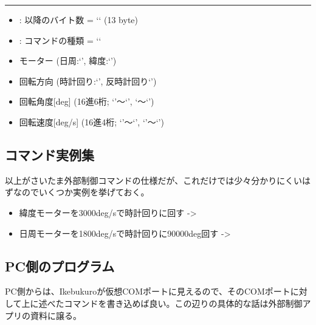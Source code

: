 \documentclass[letterpaper,10pt,dvipdfmx]{sphinxmanual}
\begin{document}
\bigskip\hrule{}\bigskip

\begin{itemize}
\item {} 
: 以降のバイト数 = `` (13 byte)

\item {} 
: コマンドの種類 = ``

\item {} 
 モーター (日周:‘’, 緯度:‘’)

\item {} 
 回転方向 (時計回り:‘\sphinxcode{+}’, 反時計回り‘\sphinxcode{-}’)

\item {} 
 回転角度{[}deg{]} (16進6桁;
‘’〜‘’, ‘〜‘’)

\item {} 
 回転速度{[}deg/s{]} (16進4桁; ‘’〜‘’,
‘’〜‘’)

\end{itemize}


\subsection{コマンド実例集}
\label{\detokenize{nissyu-idohen/ikebukuro:id11}}
以上がさいたま外部制御コマンドの仕様だが、これだけでは少々分かりにくいはずなのでいくつか実例を挙げておく。
\begin{itemize}
\item {} 
緯度モーターを3000deg/sで時計回りに回す -\textgreater{} 

\item {} 
日周モーターを1800deg/sで時計回りに90000deg回す -\textgreater{}

\end{itemize}


\subsection{PC側のプログラム}
\label{\detokenize{nissyu-idohen/ikebukuro:pc}}
PC側からは、Ikebukuroが仮想COMポートに見えるので、そのCOMポートに対して上に述べたコマンドを書き込めば良い。この辺りの具体的な話は外部制御アプリの資料に譲る。
\end{document}
